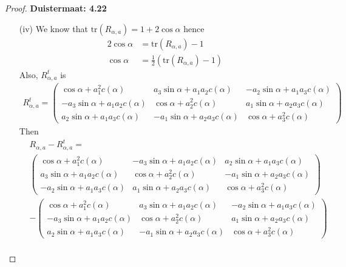 \documentclass[11pt]{article}
\newcommand{\tr}{\text{tr}}
\theoremstyle{definition}
\begin{document}
\begin{proof}{\textbf{Duistermaat: 4.22}}
\begin{itemize}
    \item [(iv)] We know that $\tr(R_{\alpha, a}) = 1 + 2\cos\alpha$ hence
    \begin{align*}
        2\cos\alpha &= \tr(R_{\alpha, a}) - 1\\
        \cos\alpha &= \frac{1}{2}(\tr(R_{\alpha, a}) - 1)
    \end{align*}
    Also, $R_{\alpha, a}^t$ is
    \begin{align*}
        R_{\alpha, a}^t = \begin{pmatrix}
            \cos\alpha + a_1^2c(\alpha)
            & a_3\sin\alpha + a_1a_2c(\alpha)
            & -a_2\sin\alpha + a_1a_3c(\alpha)\\
            -a_3\sin\alpha + a_1a_2c(\alpha)
            & \cos\alpha + a_2^2c(\alpha)
            & a_1\sin\alpha + a_2a_3c(\alpha)\\
            a_2\sin\alpha + a_1a_3c(\alpha)
            & -a_1\sin\alpha + a_2a_3c(\alpha)
            & \cos\alpha + a_3^2c(\alpha)
        \end{pmatrix}
    \end{align*}
    Then 
    \begin{align*}
        &R_{\alpha, a} - R_{\alpha, a}^t = \\
        &\begin{pmatrix}
            \cos\alpha + a_1^2c(\alpha)
            & -a_3\sin\alpha + a_1a_2c(\alpha)
            & a_2\sin\alpha + a_1a_3c(\alpha) \\
            a_3\sin\alpha + a_1a_2c(\alpha)
            & \cos\alpha + a_2^2c(\alpha)
            & -a_1\sin\alpha + a_2a_3c(\alpha) \\
            -a_2\sin\alpha + a_1a_3c(\alpha)
            & a_1\sin\alpha + a_2a_3c(\alpha)
            & \cos\alpha + a_3^2c(\alpha)
        \end{pmatrix}\\
        &- \begin{pmatrix}
            \cos\alpha + a_1^2c(\alpha)
            & a_3\sin\alpha + a_1a_2c(\alpha)
            & -a_2\sin\alpha + a_1a_3c(\alpha)\\
            -a_3\sin\alpha + a_1a_2c(\alpha)
            & \cos\alpha + a_2^2c(\alpha)
            & a_1\sin\alpha + a_2a_3c(\alpha)\\
            a_2\sin\alpha + a_1a_3c(\alpha)
            & -a_1\sin\alpha + a_2a_3c(\alpha)
            & \cos\alpha + a_3^2c(\alpha)
        \end{pmatrix}\\

\end{align*}
\end{itemize}
\end{proof}
\end{document}
